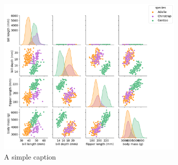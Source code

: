 \documentclass[12pt]{article}
\begin{document}

\begin{figure}[ht!]
\centering
\includegraphics[width=90mm]{pairwise.png}
\caption{A simple caption \label{fig:example}}
\end{figure}


\printbibliography
\end{document}
